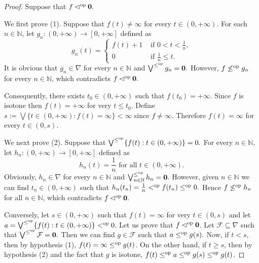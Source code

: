 \documentclass[11pt,a4paper]{amsart}
\theoremstyle{definition}
\begin{document}
	\begin{proof}
		Suppose that $f\lhd^\text{\normalfont op} \mathbf{0}.$
		
		We first prove (1). Suppose that $f(t)\neq\infty$ for every $t\in (0,+\infty).$ For each $n\in\mathbb{N}$, let $g_n:(0,+\infty)\to [0,+\infty]$ defined as
		$$g_n(t)=\begin{cases}
			f(t)+1&\text{ if }0<t<\frac{1}{n},\\
			0&\text{ if }\frac{1}{n}\leq t.
			
		\end{cases}$$
		It is obvious that $g_n\in\nabla$ for every $n\in\mathbb{N}$ and $\bigvee^{\leq^\text{\normalfont op}} g_n=\mathbf{0}.$ However, $f\not\leq^\text{\normalfont op} g_n$ for every $n\in\mathbb{N}$, which contradicts $f\lhd^\text{\normalfont op} \mathbf{0}.$
		
		Consequently, there exists $t_0\in (0,+\infty)$ such that $f(t_0)=+\infty.$ Since $f$ is isotone then $f(t)=+\infty$ for very $t\leq t_0.$ Define $s:=\bigvee\{t\in (0,+\infty):f(t)=\infty\}<\infty$ since $f\neq\boldsymbol{\infty}.$ Therefore $f(t)=\infty$ for every $t\in (0,s).$
		
		We next prove (2). Suppose that $\bigvee^{\leq^\text{\normalfont op}} \{f(t):t\in (0,+\infty)\}=0.$ For every $n\in\mathbb{N}$, let $h_n:(0,+\infty)\to [0,+\infty]$ defined as $$h_n(t)=\frac{1}{n}\text{ for all }t\in (0,+\infty).$$ Obviously, $h_n\in\nabla$ for every $n\in\mathbb{N}$ and $\bigvee^{\leq^\text{\normalfont op}}_{n\in\mathbb{N}} h_n=\mathbf{0}.$ However, given $n\in\mathbb{N}$ we can find $t_n\in (0,+\infty)$ such that $h_n(t_n)=\frac{1}{n}<^\text{\normalfont op}f(t_n)\leq^\text{\normalfont op} 0.$ Hence $f\not\leq^\text{\normalfont op} h_n$ for all $n\in\mathbb{N}$, which contradicts $f\lhd^\text{\normalfont op}\mathbf{0}.$
		
		Conversely, let $s\in(0,+\infty)$ such that $f(t)=\infty$ for very $t\in (0,s)$ and let $a=\bigvee^{\leq ^\text{\normalfont op}} \{f(t):t\in (0,+\infty)\}<^\text{\normalfont op} 0$. Let us prove that $f\lhd^\text{\normalfont op} \mathbf{0}$. Let $\mathcal{F}\subseteq \nabla$ such that $\bigvee^{\leq^\text{\normalfont op}} \mathcal{F}=\mathbf{0}.$ Then we can find $g\in \mathcal{F}$ such that $a\leq^\text{\normalfont op} g(s).$ Now, if $t<s$, then by hypothesis (1), $f(t)=\infty\leq^\text{\normalfont op}g(t)$. On the other hand, if $t\geq s$, then by hypothesis (2) and the fact that $g$ is isotone, $f(t)\leq^\text{\normalfont op}a\leq^\text{\normalfont op}g(s)\leq^\text{\normalfont op}g(t)$.
	\end{proof}
	
\end{document}
